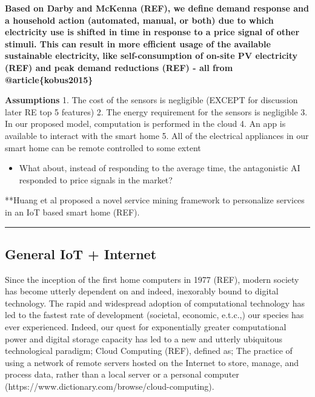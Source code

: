 \documentclass[11pt]{article}
\providecommand{\tightlist}{%
      \setlength{\itemsep}{0pt}\setlength{\parskip}{0pt}}
\begin{document}
\textbf{Based on Darby and McKenna (REF), we define demand response and
a household action (automated, manual, or both) due to which electricity
use is shifted in time in response to a price signal of other stimuli.
This can result in more efficient usage of the available sustainable
electricity, like self-consumption of on-site PV electricity (REF) and
peak demand reductions (REF) - all from @article\{kobus2015\}}

\textbf{Assumptions} 1. The cost of the sensors is negligible (EXCEPT
for discussion later RE top 5 features) 2. The energy requirement for
the sensors is negligible 3. In our proposed model, computation is
performed in the cloud 4. An app is available to interact with the smart
home 5. All of the electrical appliances in our smart home can be remote
controlled to some extent

\begin{itemize}
\tightlist
\item
  What about, instead of responding to the average time, the
  antagonistic AI responded to price signals in the market?
\end{itemize}

**Huang et al proposed a novel service mining framework to personalize
services in an IoT based smart home (REF).



\begin{center}\rule{0.5\linewidth}{\linethickness}\end{center}

    \hypertarget{general-iot-internet}{%
\subsection{General IoT + Internet}\label{general-iot-internet}}

    Since the inception of the first home computers in 1977 (REF), modern
society has become utterly dependent on and indeed, inexorably bound to
digital technology. The rapid and widespread adoption of computational
technology has led to the fastest rate of development (societal,
economic, e.t.c.,) our species has ever experienced. Indeed, our quest
for exponentially greater computational power and digital storage
capacity has led to a new and utterly ubiquitous technological paradigm;
Cloud Computing (REF), defined as; The practice of using a network of
remote servers hosted on the Internet to store, manage, and process
data, rather than a local server or a personal computer
(https://www.dictionary.com/browse/cloud-computing).
\end{document}
